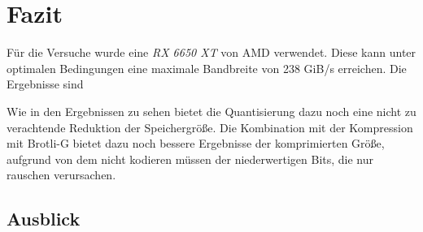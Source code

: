 \section{Fazit}
\label{sec:fazit}
Für die Versuche wurde eine \textit{RX 6650 XT} von AMD verwendet.
Diese kann unter optimalen Bedingungen eine maximale Bandbreite von 238 GiB/s erreichen.
Die Ergebnisse sind 

Wie in den Ergebnissen zu sehen bietet die Quantisierung dazu noch eine nicht zu verachtende Reduktion der Speichergröße.
Die Kombination mit der Kompression mit Brotli-G bietet dazu noch bessere Ergebnisse der komprimierten Größe, aufgrund von dem nicht kodieren müssen der niederwertigen Bits, die nur rauschen verursachen.

\subsection{Ausblick}
\label{subsec:ausblick}
